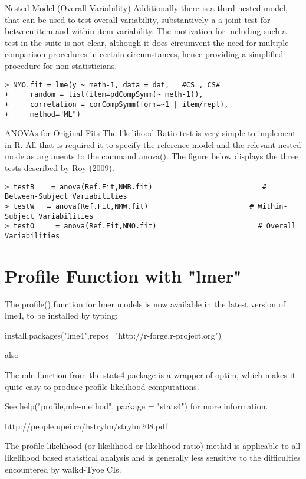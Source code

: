 \documentclass[12pt, a4paper]{report}
\begin{document}
Nested Model (Overall Variability)
Additionally there is a third nested model, that can be used to test overall variability, substantively a a joint test for between-item and within-item variability. The motivation for including such a test in the suite is not clear, although it does circumvent the need for multiple comparison procedures in certain circumstances, hence providing a simplified procedure for non-statisticians.
\begin{verbatim}
> NMO.fit = lme(y ~ meth-1, data = dat,   #CS , CS# 
+     random = list(item=pdCompSymm(~ meth-1)), 
+     correlation = corCompSymm(form=~1 | item/repl), 
+     method="ML")
\end{verbatim}

ANOVAs  for  Original Fits
The likelihood Ratio test is very simple to implement in R. All that is required it to specify the reference model and the relevant nested mode as arguments to the command anova().
The figure below displays the three tests described by Roy (2009).
\begin{verbatim}
> testB    = anova(Ref.Fit,NMB.fit)                          # Between-Subject Variabilities
> testW   = anova(Ref.Fit,NMW.fit)                        # Within-Subject Variabilities
> testO     = anova(Ref.Fit,NMO.fit)                        # Overall Variabilities
\end{verbatim}
\newpage
\section{Profile Function with "lmer"}

The profile() function for lmer models is now available in the latest version of lme4, to be installed by typing:

install.packages("lme4",repos="http://r-forge.r-project.org")

also

The mle function from the stats4 package is a wrapper of optim, which makes it quite easy to produce 
profile likelihood computations. 

See help("profile,mle-method", package = "stats4") for more information.


http://people.upei.ca/hstryhn/stryhn208.pdf

The profile likelihood (or likelihood or likelihood ratio) methid is applicable to 
all likelihood based statstical analysis and is generally less sensitive to the difficulties
encountered by walkd-Tyoe CIs.
\end{document}
